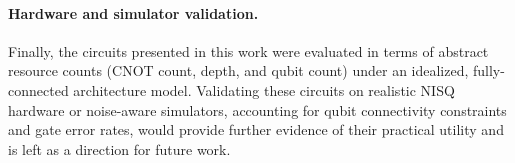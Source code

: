 \paragraph{Hardware and simulator validation.}
Finally, the circuits presented in this work were evaluated in terms of abstract resource counts (CNOT count, depth, and qubit count) under an idealized, fully-connected architecture model. Validating these circuits on realistic NISQ hardware or noise-aware simulators, accounting for qubit connectivity constraints and gate error rates, would provide further evidence of their practical utility and is left as a direction for future work.